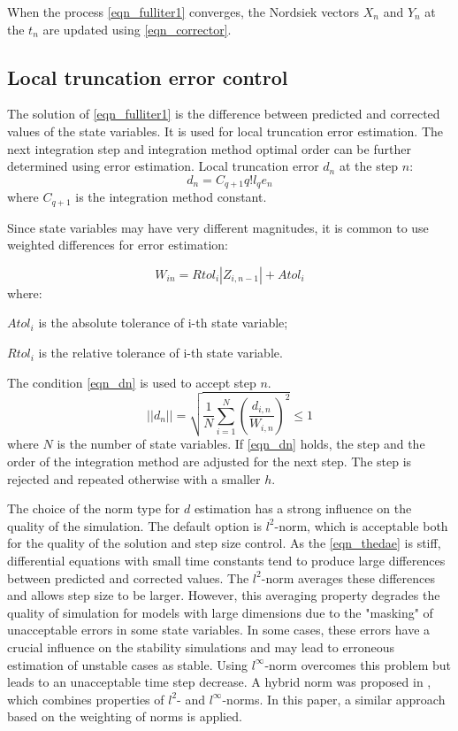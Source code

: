 \documentclass[lettersize,journal]{IEEEtran}
\begin{document}
When the process \eqref{eqn_fulliter1} converges, the Nordsiek vectors \(X_n\) and \(Y_n\) at the \(t_n\) are updated using \eqref{eqn_corrector}.
\subsection{Local truncation error control}
The solution of \eqref{eqn_fulliter1} is the difference between predicted and corrected values of the state variables. It is used for local truncation error estimation. The next integration step and integration method optimal order can be further determined using error estimation. Local truncation error \(d_n\) at the step \(n\):
\begin{equation}
	d_n=C_{q+1}q!l_qe_n
\end{equation}
\noindent where \(C_{q+1}\) is the integration method constant.

Since state variables may have very different magnitudes, it is common to use weighted differences for error estimation:

\begin{equation}
	W_{in}=Rtol_i|Z_{i,n-1}|+Atol_i
\end{equation}
\noindent where:
\begin{description}
	\item \(Atol_i\) is the absolute tolerance of i-th state variable;
	\item \(Rtol_i\) is the relative tolerance of i-th state variable.
\end{description}

The condition \eqref{eqn_dn} is used to accept step \(n\). 
\begin{equation}
	\label{eqn_dn}
	\vert\vert d_n \vert\vert = \sqrt{\frac{1}{N} \sum_{i=1}^{N}{\left(\frac{d_{i,n}}{W_{i,n}}\right)^2}} \leq 1
\end{equation}
\noindent where \(N\) is the number of state variables.
If \eqref{eqn_dn} holds, the step and the order of the integration method are adjusted for the next step. The step is rejected and repeated otherwise with a smaller \(h\).

The choice of the norm type for \(d\) estimation has a strong influence on the quality of the simulation. The default option is \(l^2\)-norm, which is acceptable both for the quality of the solution and step size control. As the \eqref{eqn_thedae} is stiff, differential equations with small time constants tend to produce large differences between predicted and corrected values. The \(l^2\)-norm averages these differences and allows step size to be larger.  However, this averaging property degrades the quality of simulation for models with large dimensions due to the "masking" of unacceptable errors in some state variables. In some cases, these errors have a crucial influence on the stability simulations and may lead to erroneous estimation of unstable cases as stable. Using \(l^\infty\)-norm overcomes this problem but leads to an unacceptable time step decrease. A hybrid norm was proposed in \cite{pegase10}, which combines properties of \(l^2\)- and \(l^\infty\)-norms. In this paper, a similar approach based on the weighting of norms is applied.
\end{document}
